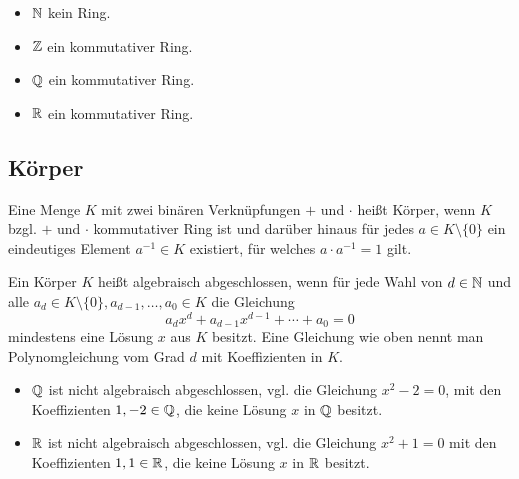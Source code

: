 \begin{bsp}
\begin{itemize}
		\item $\mathbb{N}$ kein Ring. 
		\item $\mathbb{Z}$ ein kommutativer Ring. 
		\item $\mathbb{Q}$ ein kommutativer Ring. 
		\item $\mathbb{R}$ ein kommutativer Ring. 
\end{itemize} 
\end{bsp} 

\subsection{Körper} 

\begin{defn}
	Eine Menge $K$ mit zwei binären Verknüpfungen $+$ und $\cdot$ heißt Körper, wenn $K$ bzgl. $+$ und $\cdot$ kommutativer Ring ist und darüber hinaus für jedes $a \in K \setminus \{0\}$ ein eindeutiges Element $a^{-1} \in K$ existiert, für welches $a \cdot a^{-1}  = 1$ gilt. 
\end{defn} 

\begin{bsp}
\begin{itemize} 
\end{itemize} 
\end{bsp} 

\begin{defn}
	Ein Körper $K$ heißt algebraisch abgeschlossen, wenn für jede Wahl von $d \in \mathbb{N}$ und alle $a_d \in K \setminus \{0\}, a_{d-1},\ldots,a_0 \in K$ die Gleichung 
	\[
	a_d x^d + a_{d-1} x^{d-1} + \cdots + a_0 = 0
	\]
	mindestens eine Lösung $x$ aus $K$ besitzt. Eine Gleichung wie oben nennt man Polynomgleichung vom Grad $d$ mit Koeffizienten in $K$. 
\end{defn} 

\begin{bsp}
	\begin{itemize} 
		\item $\mathbb{Q}$ ist nicht algebraisch abgeschlossen, vgl. die Gleichung $x^2 - 2 = 0$, mit den Koeffizienten $1, -2 \in \mathbb{Q}$, die keine Lösung $x$ in $\mathbb{Q}$ besitzt. 
		\item $\mathbb{R}$ ist nicht algebraisch abgeschlossen, vgl. die Gleichung $x^2 + 1 = 0$ mit den Koeffizienten $1, 1 \in \mathbb{R}$, die keine Lösung $x$ in $\mathbb{R}$ besitzt. 
	\end{itemize} 
\end{bsp} 

